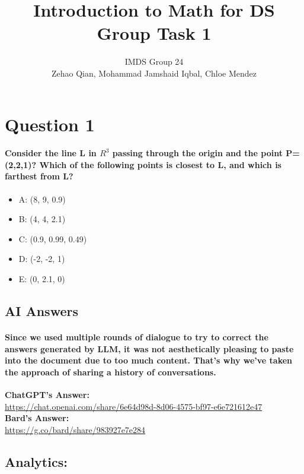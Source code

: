 \documentclass[11pt]{article} %
\title{Introduction to Math for DS Group Task 1}
\author{IMDS Group 24 \\ Zehao Qian, Mohammad Jamshaid Iqbal, Chloe Mendez}
\begin{document}
\maketitle
% 
% 
% 
\section{Question 1}
\paragraph{Consider the line L in $R^3$ passing through the origin and the point P=(2,2,1)? Which of the following points is closest to L, and which is farthest from L?}
\begin{itemize}
    \item A: (8, 9, 0.9)
    \item B: (4, 4, 2.1)
    \item C: (0.9, 0.99, 0.49)
    \item D: (-2, -2, 1)
    \item E: (0, 2.1, 0)
\end{itemize}
% 
% 
% 
% 
\subsection{AI Answers}
\paragraph{Since we used multiple rounds of dialogue to try to correct the answers generated by LLM, it was not aesthetically pleasing to paste into the document due to too much content. That's why we've taken the approach of sharing a history of conversations.}
\begin{mdframed}[
        backgroundcolor=white,  %
        linecolor=black,        %
        leftmargin=5pt,         %
        rightmargin=5pt,        %
        linewidth=2pt           %
    ]
    \textbf{ChatGPT's Answer: } \\
    \href{https://chat.openai.com/share/6e64d98d-8d06-4575-bf97-e6e721612e47}{https://chat.openai.com/share/6e64d98d-8d06-4575-bf97-e6e721612e47} \\
    \textbf{Bard's Answer: } \\
    \href{https://g.co/bard/share/983927e7e284}{https://g.co/bard/share/983927e7e284}
\end{mdframed}
% 
% 
% 
% 
\subsection{Analytics:}
\end{document}
